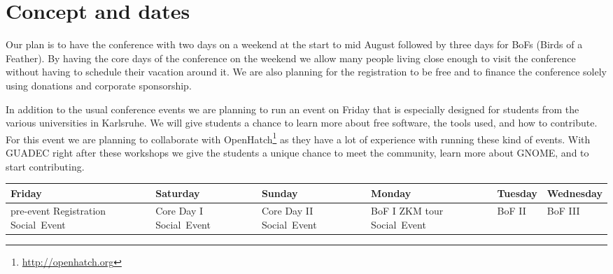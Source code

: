 
\newpage




\begin{tikzpicture}
\end{tikzpicture}

\vspace*{8.5cm}

\section{Concept and dates}

Our plan is to have the conference with two days on a weekend at the start to mid
August followed by three days for BoFs (Birds of a Feather). By having the core
days of the conference on the weekend we allow many people living close enough to visit
the conference without having to schedule their vacation around it. We are also
planning for the registration to be free and to finance the conference solely
using donations and corporate sponsorship.

In addition to the usual conference events we are planning to run an event
on Friday that is especially designed for students from the various universities
in Karlsruhe. We will give students a chance to learn more about free software,
the tools used, and how to contribute. For this event we are planning to collaborate with
OpenHatch\footnote{\url{http://openhatch.org}} as they have a lot of experience
with running these kind of events. With GUADEC right after these workshops
we give the students a unique chance to meet the community, learn more about GNOME,
and to start contributing.

\begin{tabularx}{\linewidth}{X|X|X|X|X|X}
\bf Friday & \bf Saturday & \bf Sunday & \bf Monday & \bf Tuesday & \bf Wednesday \\\hline
  pre-event \newline
  Registration \newline
  Social~Event
 &
  Core Day I \newline
  Social~Event
 &
  Core Day II \newline
  Social~Event
 &
  BoF I \newline
  ZKM tour \newline
  Social~Event
 &
  BoF II
 &
  BoF III
\end{tabularx}


